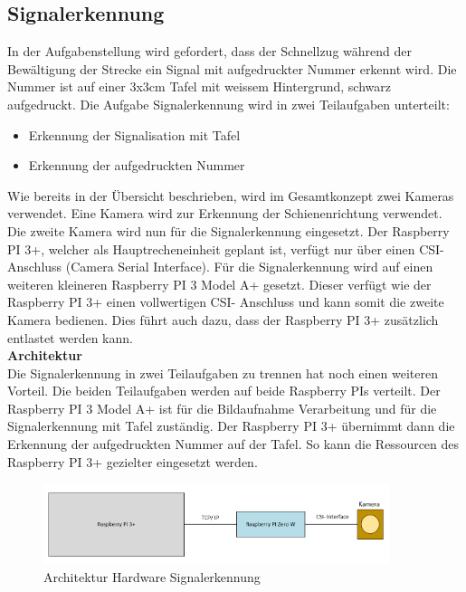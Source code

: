 \documentclass[../../main.tex]{subfiles}
\begin{document}
\subsection{Signalerkennung}
    In der Aufgabenstellung wird gefordert, dass der Schnellzug während der Bewältigung der Strecke ein Signal mit aufgedruckter Nummer erkennt wird. Die Nummer ist auf einer 3x3cm Tafel mit weissem Hintergrund, schwarz aufgedruckt. Die Aufgabe Signalerkennung wird in zwei Teilaufgaben unterteilt:
    \begin{itemize}
        \item Erkennung der Signalisation mit Tafel
        \item Erkennung der aufgedruckten Nummer
    \end{itemize}
    Wie bereits in der Übersicht beschrieben, wird im Gesamtkonzept zwei Kameras verwendet. Eine Kamera wird zur Erkennung der Schienenrichtung verwendet. Die zweite Kamera wird nun für die Signalerkennung eingesetzt. Der Raspberry PI 3+, welcher als Hauptrecheneinheit geplant ist, verfügt nur über einen CSI- Anschluss (Camera Serial Interface). Für die Signalerkennung wird auf einen weiteren kleineren Raspberry PI 3 Model A+ gesetzt. Dieser verfügt wie der Raspberry PI 3+ einen vollwertigen CSI- Anschluss und kann somit die zweite Kamera bedienen. Dies führt auch dazu, dass der Raspberry PI 3+ zusätzlich entlastet werden kann.\\

    \textbf{Architektur}\\
    Die Signalerkennung in zwei Teilaufgaben zu trennen hat noch einen weiteren Vorteil. Die beiden Teilaufgaben werden auf beide Raspberry PIs verteilt. Der Raspberry PI 3 Model A+ ist für die Bildaufnahme Verarbeitung und für die Signalerkennung mit Tafel zuständig. Der Raspberry PI 3+ übernimmt dann die Erkennung der aufgedruckten Nummer auf der Tafel. So kann die Ressourcen des Raspberry PI 3+ gezielter eingesetzt werden.

    \begin{figure}[H] %
        \centering
        \includegraphics[width=0.9\textwidth]{Architektur.png}
        \caption{Architektur Hardware Signalerkennung}
        \label{fig:architektur_hardware_signalerkennung}
    \end{figure}
\end{document}
